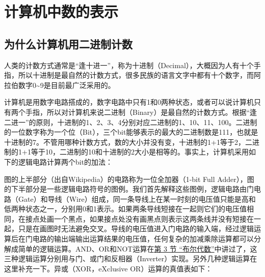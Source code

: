 

\chapter{计算机中数的表示}
%





\section{为什么计算机用二进制计数}
%
人类的计数方式通常是“逢十进一”，称为十进制（Decimal），大概因为人有十个手指，所以十进制是最自然的计数方式，很多民族的语言文字中都有十个数字，而阿拉伯数字0\textasciitilde{}\BookSplit{}9是目前最广泛采用的。



计算机是用数字电路搭成的，数字电路中只有1和0两种状态，或者可以说计算机只有两个手指，所以对计算机来说二进制（Binary）是最自然的计数方式。根据“逢二进一”的原则，十进制的1、2、3、4分别对应二进制的1、10、11、100。二进制的一位数字称为一个位（Bit），三个bit能够表示的最大的二进制数是111，也就是十进制的7。不管用哪种计数方式，数的大小并没有变，十进制的1+\BookSplit{}1等于2，二进制的1+\BookSplit{}1等于10，二进制的10和十进制的2大小是相等的。事实上，计算机采用如下的逻辑电路计算两个bit的加法：




图的上半部分（出自Wikipedia）的电路称为一位全加器（1-bit Full Adder），图的下半部分是一些逻辑电路符号的图例。我们首先解释这些图例，逻辑电路由门电路（Gate）和导线（Wire）组成，同一条导线上在某一时刻的电压值只能是高和低两种状态之一，分别用0和1表示。如果两条导线短接在一起则它们的电压值相同，在接点处画一个黑点，如果接点处没有画黑点则表示这两条线并没有短接在一起，只是在画图时无法避免交叉。导线的电压值进入门电路的输入端，经过逻辑运算后在门电路的输出端输出运算结果的电压值，任何复杂的加减乘除运算都可以分解成简单的逻辑运算。AND、OR和NOT运算在\hyperlink{db.ch04s03.id2718970}{第 3 节 “布尔代数”}中讲过了，这三种逻辑运算分别用与门、或门和反相器（Inverter）实现。另外几种逻辑运算在这里补充一下。异或（XOR，eXclusive OR）运算的真值表如下：


